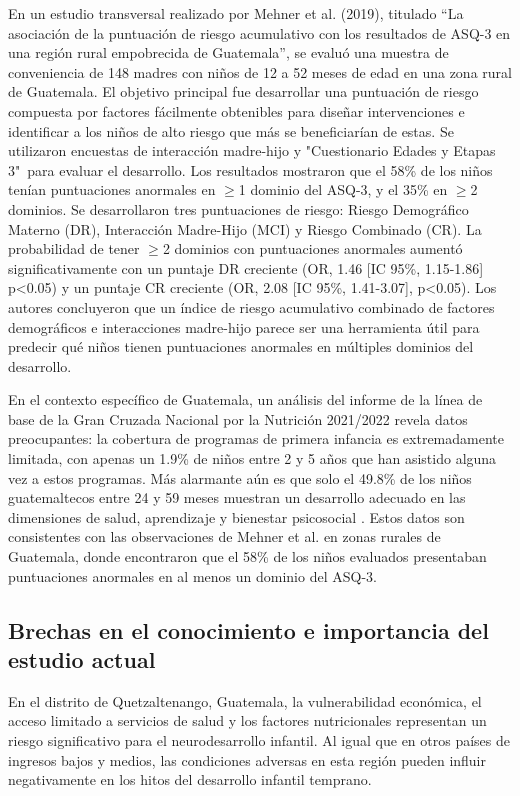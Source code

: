 \documentclass[11pt,letterpaper]{report}
\newcommand{\asq}{"Cuestionario Edades y Etapas 3"}
\begin{document}
En un estudio transversal realizado por Mehner et al. (2019), titulado
``La asociación de la puntuación de riesgo acumulativo con los resultados de
ASQ-3 en una región rural empobrecida de Guatemala'', se evaluó una muestra de
conveniencia de 148 madres con niños de 12 a 52 meses de edad en una zona rural
de Guatemala. El objetivo principal fue desarrollar una puntuación de riesgo
compuesta por factores fácilmente obtenibles para diseñar intervenciones e
identificar a los niños de alto riesgo que más se beneficiarían de estas. Se
utilizaron encuestas de interacción madre-hijo y \asq\ para evaluar el
desarrollo. Los resultados mostraron que el 58\% de los niños tenían
puntuaciones anormales en $\ge$1 dominio del ASQ-3, y el 35\% en $\ge$2
dominios. Se desarrollaron tres puntuaciones de riesgo: Riesgo Demográfico
Materno (DR), Interacción Madre-Hijo (MCI) y Riesgo Combinado (CR). La
probabilidad de tener $\ge$2 dominios con puntuaciones anormales aumentó
significativamente con un puntaje DR creciente (OR, 1.46 [IC 95\%, 1.15-1.86]
p<0.05) y un puntaje CR creciente (OR, 2.08 [IC 95\%, 1.41-3.07], p<0.05). Los
autores concluyeron que un índice de riesgo acumulativo combinado de factores
demográficos e interacciones madre-hijo parece ser una herramienta útil para
predecir qué niños tienen puntuaciones anormales en múltiples dominios del
desarrollo. \cite{CMehner2019}

En el contexto específico de Guatemala, un análisis del informe de la  línea de
base de la Gran Cruzada Nacional por la Nutrición 2021/2022 revela  datos
preocupantes: la cobertura de programas de primera infancia es extremadamente
limitada, con apenas un 1.9\% de niños entre 2 y 5 años que han asistido alguna
vez a estos programas. Más alarmante aún es que solo el 49.8\% de los niños
guatemaltecos entre 24 y 59 meses muestran un desarrollo adecuado  en las
dimensiones de salud, aprendizaje y bienestar psicosocial \cite{SESAN2022}.
Estos datos son consistentes con las observaciones de Mehner et al.
\cite{CMehner2019} en zonas rurales de Guatemala, donde encontraron que el 58\%
de los niños evaluados presentaban puntuaciones anormales en al menos un
dominio del ASQ-3.

\subsection{Brechas en el conocimiento e importancia del estudio actual}
En el distrito de Quetzaltenango, Guatemala, la vulnerabilidad económica, el
acceso limitado a servicios de salud y los factores nutricionales representan
un riesgo significativo para el neurodesarrollo infantil. Al igual que en otros
países de ingresos bajos y medios, las condiciones adversas en esta región
pueden influir negativamente en los hitos del desarrollo infantil temprano.
\end{document}
